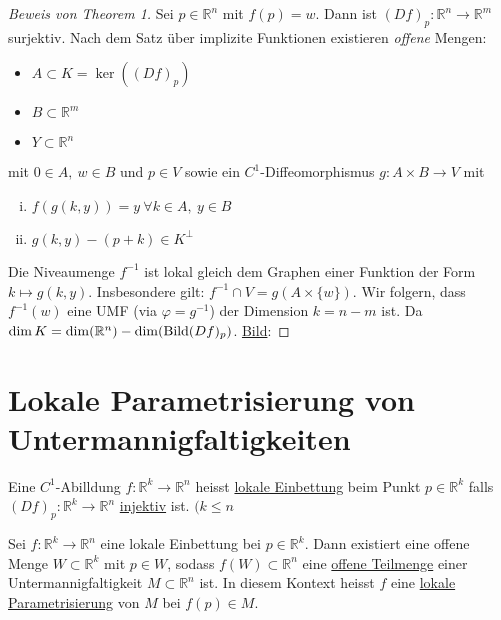 \documentclass[../main.tex]{subfiles}
\begin{document}
\begin{proof}[Beweis von Theorem 1]
Sei $p \in \mathbb{R}^n$ mit $f(p)=w$. Dann ist $(Df)_p \colon \mathbb{R}^n \to \mathbb{R}^m$ surjektiv.
Nach dem Satz über implizite Funktionen existieren \emph{offene} Mengen:
\begin{itemize}
    \item $A \subset K = \ker\left((Df)_p\right)$
    \item $B \subset \mathbb{R}^m$
    \item $Y \subset \mathbb{R}^n$
\end{itemize}
mit $0\in A, \ w\in B$ und $p \in V$ sowie ein $C^1$-Diffeomorphismus $g\colon A \times B \to V$ mit
\begin{enumerate}[i)]
    \item $f(g(k,y))=y \ \forall k \in A, \ y\in B$
    \item $g(k,y) - (p+k) \in K^{\perp}$
\end{enumerate}
Die Niveaumenge $f^{-1}$ ist lokal gleich dem Graphen einer Funktion der Form $k \mapsto g(k,y)$.
Insbesondere gilt: $f^{-1} \cap V = g(A\times \{w\})$. Wir folgern, dass $f^{-1}(w)$ eine UMF (via $\varphi = g^{-1}$) der Dimension $k=n-m$ ist. Da $\dim K = \dim (\mathbb{R}^n)- \dim(\operatorname{Bild}(Df)_p)$. \newline \newline
\underline{Bild}:
\end{proof}

\newpage

\section{Lokale Parametrisierung von Untermannigfaltigkeiten}
\begin{definition}
Eine $C^1$-Abilldung $f : \mathbb{R}^k \to \mathbb{R}^n$ heisst
\underline{lokale Einbettung} beim Punkt $p \in \mathbb{R}^k$ falls $(Df)_p : \mathbb{R}^k \to \mathbb{R}^n$ \underline{injektiv} ist. $(k \leq n$
\end{definition}

\begin{theorem}
Sei $f : \mathbb{R}^k \to \mathbb{R}^n$ eine lokale Einbettung bei $p \in \mathbb{R}^k$. Dann existiert eine offene Menge
$W \subset \mathbb{R}^k$ mit $p \in W$, sodass $f(W) \subset \mathbb{R}^n $ eine \underline{offene Teilmenge} einer Untermannigfaltigkeit $M \subset \mathbb{R}^n$ ist. \newline
In diesem Kontext heisst $f$ eine \underline{lokale Parametrisierung} von $M$ bei $f(p) \in M$.
\end{theorem}
\end{document}
